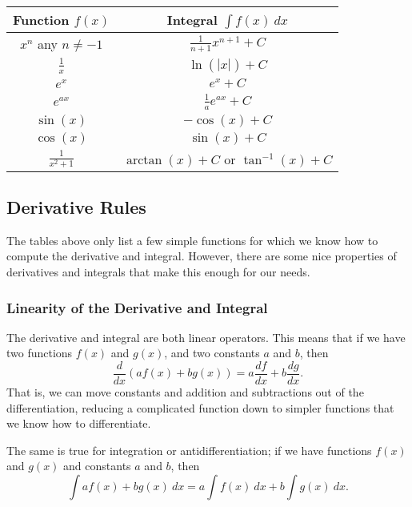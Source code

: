 \documentclass{ximera}
\begin{document}
\begin{center}
    \begin{tabular}{|c|c|} \hline
        \textbf{Function $f(x)$} & \textbf{Integral $\int f(x)\ dx$} \\ \hline
        $x^n$ any $n \neq -1$ & $\frac{1}{n+1}x^{n+1} + C$ \\ \hline
        $\frac{1}{x}$ & $\ln(|x|) + C$ \\ \hline
        $e^x$ & $e^x + C$ \\ \hline
        $e^{ax}$ & $\frac{1}{a}e^{ax} + C$ \\ \hline
        $\sin(x)$ & $-\cos(x) + C$ \\ \hline
        $\cos(x)$ & $\sin(x) + C$ \\ \hline
        $\frac{1}{x^2 + 1}$ & $\arctan(x) + C$ or $\tan^{-1}(x) + C$ \\ \hline
    \end{tabular}
\end{center}

\subsection{Derivative Rules}

The tables above only list a few simple functions for which we know how to compute the derivative and integral. However, there are some nice properties of derivatives and integrals that make this enough for our needs.

\subsubsection{Linearity of the Derivative and Integral}

The derivative and integral are both linear operators. This means that if we have two functions $f(x)$ and $g(x)$, and two constants $a$ and $b$, then 
\[ 
    \frac{d}{dx}\left( af(x) + bg(x)\right) = a\frac{df}{dx} + b\frac{dg}{dx}. 
\] 
That is, we can move constants and addition and subtractions out of the differentiation, reducing a complicated function down to simpler functions that we know how to differentiate. 

The same is true for integration or antidifferentiation; if we have functions $f(x)$ and $g(x)$ and constants $a$ and $b$, then
\[ 
    \int af(x) + bg(x) \ dx = a\int f(x)\ dx + b\int g(x)\ dx. 
\]
\end{document}
